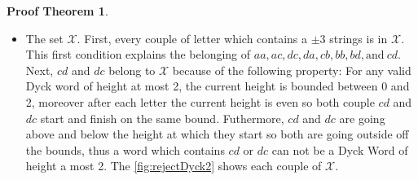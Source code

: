 \documentclass[11pt,a4paper]{article}
\theoremstyle{definition}
\theoremstyle{plain}
\theoremstyle{definition}
\newtheorem{tproof}{Proof Theorem}[section]
\begin{document}
\begin{tproof}
\begin{table}[htb]
        \newpage
    \end{table}
    \begin{itemize}
        \item The set $\mathcal{X}$. First, every couple of letter which contains
              a $\pm 3$ strings is in $\mathcal{X}$. This first condition explains the belonging
              of $aa, ac, dc, da, cb, bb, bd, \textrm{and}\ cd $. Next, $cd$ and $dc$ belong
              to $\mathcal{X}$ because of the following property: For any valid Dyck word of
              height at most 2, the current height is bounded between 0 and 2, moreover after each
              letter the current height is even so both couple $cd$ and $dc$ start
              and finish on the same bound. Futhermore,  $cd$ and $dc$ are going
              above and below the height at which they start so both are going outside off the
              bounds, thus a word which contains $cd$ or $dc$ can not be a Dyck Word of height a most 2.
              The \autoref{fig:rejectDyck2} shows each couple of $\mathcal{X}$.


\end{itemize}
\end{tproof}
\end{document}
